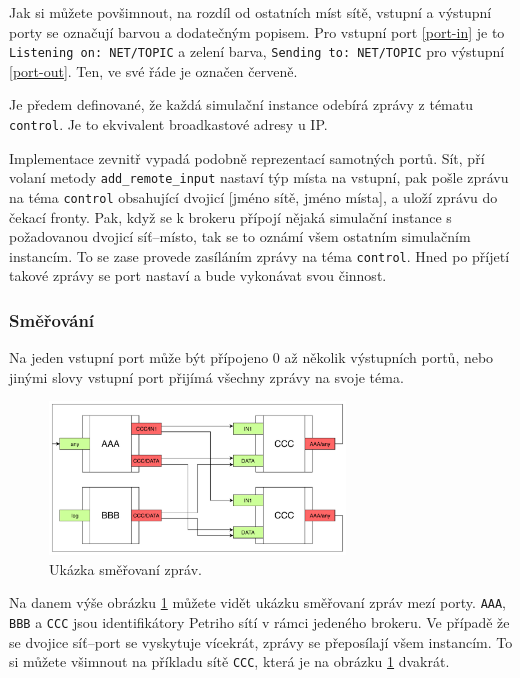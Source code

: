 Jak si můžete povšimnout, na rozdíl od ostatních míst sítě, vstupní a výstupní porty se označují barvou a dodatečným popisem. Pro vstupní port \ref{port-in} je to \texttt{Listening on: NET/TOPIC} a zelení barva, \texttt{Sending to: NET/TOPIC} pro výstupní \ref{port-out}. Ten, ve své řáde je označen červeně.

Je předem definované, že každá simulační instance odebírá zprávy z tématu \texttt{control}. Je to ekvivalent broadkastové adresy u IP.

Implementace zevnitř vypadá podobně reprezentací samotných portů. Sít, pří volaní metody \texttt{add\_remote\_input} nastaví týp místa na vstupní, pak pošle zprávu na téma \texttt{control} obsahující dvojicí [jméno sítě, jméno místa], a uloží zprávu do čekací fronty. Pak, když se k brokeru přípojí nějaká simulační instance s požadovanou dvojicí síť--místo, tak se to oznámí všem ostatním simulačním instancím. To se zase provede zasíláním zprávy na téma \texttt{control}. Hned po příjetí takové zprávy se port nastaví a bude vykonávat svou činnost.

\subsubsection{Směřování}
Na jeden vstupní port může být přípojeno 0 až několik výstupních portů, nebo jinými slovy vstupní port přijímá všechny zprávy na svoje téma.

\begin{figure}[htb]
  \centering
  \includegraphics[width=0.7\textwidth]{obrazky-figures/Port-routing.pdf}
  \caption{Ukázka směřovaní zpráv.}
  \label{route-viz}
\end{figure}

Na danem výše obrázku \ref{route-viz} můžete vidět ukázku směřovaní zpráv mezí porty. \texttt{AAA}, \texttt{BBB} a \texttt{CCC} jsou identifikátory Petriho sítí v rámci jedeného brokeru. Ve případě že se dvojice síť--port se vyskytuje vícekrát, zprávy se přeposílají všem instancím. To si můžete všimnout na příkladu sítě \texttt{CCC}, která je na obrázku \ref{route-viz} dvakrát.


